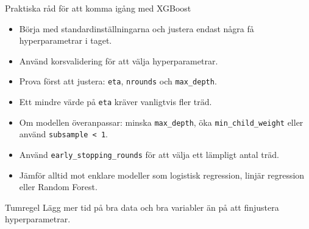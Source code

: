 \documentclass[10pt,english]{beamer}
\begin{document}
\begin{frame}{Praktiska råd för att komma igång med XGBoost}

\begin{itemize}

  \item Börja med standardinställningarna och justera endast
        några få hyperparametrar i taget.

  \item Använd korsvalidering för att välja hyperparametrar.

  \item Prova först att justera:
        \texttt{eta},
        \texttt{nrounds} och
        \texttt{max\_depth}.

  \item Ett mindre värde på \texttt{eta} kräver vanligtvis fler träd.

  \item Om modellen överanpassar:
        minska \texttt{max\_depth},
        öka \texttt{min\_child\_weight}
        eller använd \texttt{subsample < 1}.

  \item Använd \texttt{early\_stopping\_rounds}
        för att välja ett lämpligt antal träd.

  \item Jämför alltid mot enklare modeller som
        logistisk regression, linjär regression eller Random Forest.

\end{itemize}

\vspace{0.3cm}

\begin{block}{Tumregel}
Lägg mer tid på bra data och bra variabler
än på att finjustera hyperparametrar.
\end{block}

\end{frame}
\end{document}
